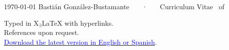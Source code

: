 \documentclass[11pt, a4paper]{bgonzalezbustamante-style}
\begin{document}
\makecvheader

\makecvfooter
  {\today}
  {Bastián González-Bustamante ~~~·~~~ Curriculum Vitae}
  {\thepage\ of \pageref*{LastPage}}



















\vspace{10mm}
\raggedleft
{\footnotesize Typed in {\small X$_{\exists}${\LaTeX}} with hyperlinks.}\\
{\footnotesize References upon request.}\\
{\footnotesize \textcolor{oxfordblue}{\normalsize \faGithub} \href{https://bgonzalezbustamante.github.io/CV-XeLaTeX/}{\textcolor{blue}{Download the latest version in English or Spanish}}.}
\end{document}
